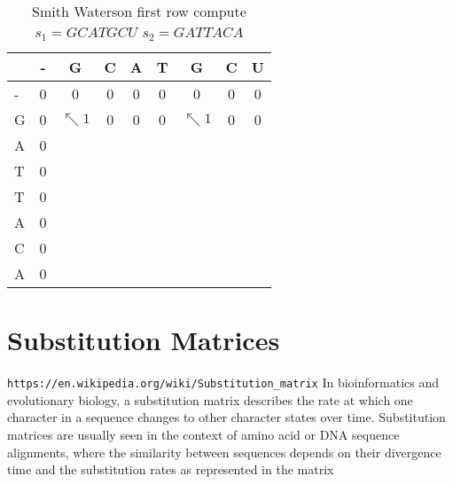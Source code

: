 \documentclass[11pt]{article}
\begin{document}
\begin{table}[ht]
	\caption{Smith Waterson first row compute $s_1 = GCATGCU$ $s_2 = GATTACA$}
	\label{tab:SW_frtrow}
	\centering

	\begin{tabular}{l|c ccccccc}
	\hline

	\hline
		  & - & G & C & A & T & G & C & U \\
	\hline
	 	- & 0  & 0 & 0 & 0 & 0 & 0 & 0 & 0 \\
	 	G & 0  & $\nwarrow 1$ & 0 & 0 & 0 & $\nwarrow 1$ & 0 & 0 \\
	 	A & 0  &   &   &   &   &   &   &   \\
	 	T & 0  &   &   &   &   &   &   &   \\
	 	T & 0  &   &   &   &   &   &   &   \\
	 	A & 0  &   &   &   &   &   &   &   \\
	 	C & 0  &   &   &   &   &   &   &   \\
	 	A & 0  &   &   &   &   &   &   &   \\
	\hline
	\end{tabular}
\end{table}






























\newpage
\section{Substitution Matrices} %
\label{sec:substitution_matrices}
\texttt{https://en.wikipedia.org/wiki/Substitution\_matrix}
In bioinformatics and evolutionary biology, a substitution matrix describes the rate at which one character in a sequence changes to other character states over time. Substitution matrices are usually seen in the context of amino acid or DNA sequence alignments, where the similarity between sequences depends on their divergence time and the substitution rates as represented in the matrix
\end{document}
